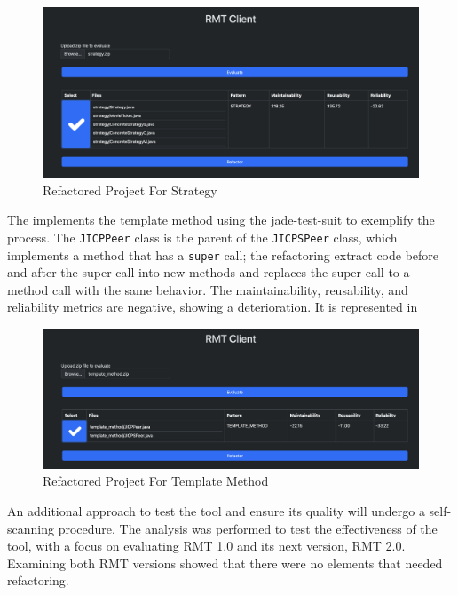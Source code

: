 \begin{figure}[ht!]
\caption{Refactored Project For Strategy}
\label{fig-strategy-client}
\includegraphics[width =\textwidth]{Chapter-5/Figures/rmt-strategy-client.png}
\end{figure}
\FloatBarrier

The \textcite{zafeiris2017automated} implements the template method using the jade-test-suit to exemplify the process. The \texttt{JICPPeer} class is the parent of the \texttt{JICPSPeer} class, which implements a method that has a \texttt{super} call; the refactoring extract code before and after the super call into new methods and replaces the super call to a method call with the same behavior. The maintainability, reusability, and reliability metrics are negative, showing a deterioration. It is represented in 

\begin{figure}[ht!]
\caption{Refactored Project For Template Method}
\label{fig-template-client}
\includegraphics[width =\textwidth]{Chapter-5/Figures/rmt-template-client.png}
\end{figure}
\FloatBarrier

An additional approach to test the tool and ensure its quality will undergo a self-scanning procedure. The analysis was performed to test the effectiveness of the tool, with a focus on evaluating RMT 1.0 and its next version, RMT 2.0. Examining both RMT versions showed that there were no elements that needed refactoring. 

